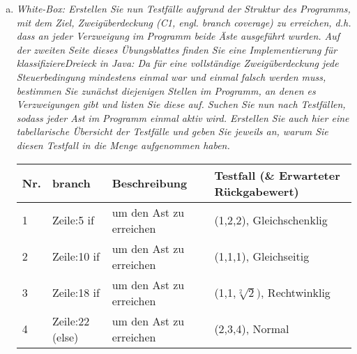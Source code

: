 \begin{enumerate}[(a)]
\item{\itshape White-Box: Erstellen Sie nun Testfälle aufgrund der Struktur des Programms, mit dem
Ziel, Zweigüberdeckung (C1, engl. branch coverage) zu erreichen, d.h. dass an jeder
Verzweigung im Programm beide Äste ausgeführt wurden.
Auf der zweiten Seite dieses Übungsblattes finden Sie eine Implementierung für
klassifiziereDreieck in Java: Da für eine vollständige Zweigüberdeckung jede Steuerbedingung mindestens einmal war und einmal falsch werden muss, bestimmen Sie
zunächst diejenigen Stellen im Programm, an denen es Verzweigungen gibt und listen
Sie diese auf.
Suchen Sie nun nach Testfällen, sodass jeder Ast im Programm einmal aktiv wird. Erstellen Sie auch hier eine tabellarische Übersicht der Testfälle und geben Sie jeweils
an, warum Sie diesen Testfall in die Menge aufgenommen haben.}
    \begin{itemize}
         \begin{tabular}{l|l|l|l}
            Nr. &  branch & Beschreibung & Testfall (\& Erwarteter Rückgabewert) \\ \hline  
            1 & Zeile:5 if & um den Ast zu erreichen & (1,2,2), Gleichschenklig \\ \hline 
            2 & Zeile:10 if & um den Ast zu erreichen & (1,1,1), Gleichseitig \\ \hline 
            3 & Zeile:18 if & um den Ast zu erreichen & (1,1,$\sqrt[2]{2})$, Rechtwinklig \\ \hline 
            4 & Zeile:22 (else) & um den Ast zu erreichen & (2,3,4), Normal \\ \hline 
        \end{tabular}
    \end{itemize}



\end{enumerate}
